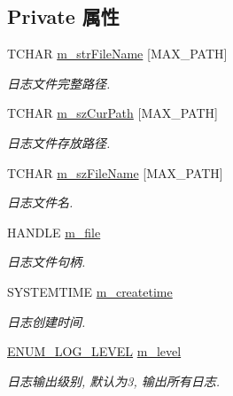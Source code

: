 \subsection*{Private 属性}
\begin{DoxyCompactItemize}
\item 
T\+C\+H\+A\+R \hyperlink{classcommon_1_1_c_text_log_a1e17cd173b1b0f1fe7dcd68a2dbdbe34}{m\+\_\+str\+File\+Name} \mbox{[}M\+A\+X\+\_\+\+P\+A\+T\+H\mbox{]}
\begin{DoxyCompactList}\small\item\em 日志文件完整路径. \end{DoxyCompactList}\item 
T\+C\+H\+A\+R \hyperlink{classcommon_1_1_c_text_log_aca6715190bbbdc7f30a28c71b808db3d}{m\+\_\+sz\+Cur\+Path} \mbox{[}M\+A\+X\+\_\+\+P\+A\+T\+H\mbox{]}
\begin{DoxyCompactList}\small\item\em 日志文件存放路径. \end{DoxyCompactList}\item 
T\+C\+H\+A\+R \hyperlink{classcommon_1_1_c_text_log_a05e97e2cd0b36c02f51a2affd016acbb}{m\+\_\+sz\+File\+Name} \mbox{[}M\+A\+X\+\_\+\+P\+A\+T\+H\mbox{]}
\begin{DoxyCompactList}\small\item\em 日志文件名. \end{DoxyCompactList}\item 
H\+A\+N\+D\+L\+E \hyperlink{classcommon_1_1_c_text_log_aee55c31c87ce36ba34f11e7503355351}{m\+\_\+file}
\begin{DoxyCompactList}\small\item\em 日志文件句柄. \end{DoxyCompactList}\item 
S\+Y\+S\+T\+E\+M\+T\+I\+M\+E \hyperlink{classcommon_1_1_c_text_log_ab60caf7016e093cc7276e27a3a60f22d}{m\+\_\+createtime}
\begin{DoxyCompactList}\small\item\em 日志创建时间. \end{DoxyCompactList}\item 
\hyperlink{classcommon_1_1_c_text_log_ae22e9f5eba143051e1193e62caf63aee}{E\+N\+U\+M\+\_\+\+L\+O\+G\+\_\+\+L\+E\+V\+E\+L} \hyperlink{classcommon_1_1_c_text_log_ad800d8c6a9cfb7357da2044cf4deeb25}{m\+\_\+level}
\begin{DoxyCompactList}\small\item\em 日志输出级别, 默认为3, 输出所有日志. \end{DoxyCompactList}\item 

\end{DoxyCompactItemize}
